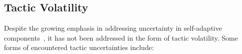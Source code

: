 \documentclass[11pt]{proposalnsf}
\newlength\q %
\begin{document}
\begin{sloppypar}




\subsection*{Tactic Volatility} 

Despite the growing emphasis in addressing uncertainty in self-adaptive components~\cite{moreno2016efficient, camara2017reasoning, esfahani2013uncertainty, moreno2018uncertainty}, it has not been addressed in the form of tactic volatility. Some forms of encountered tactic uncertainties include:


\end{sloppypar}
\end{document}
